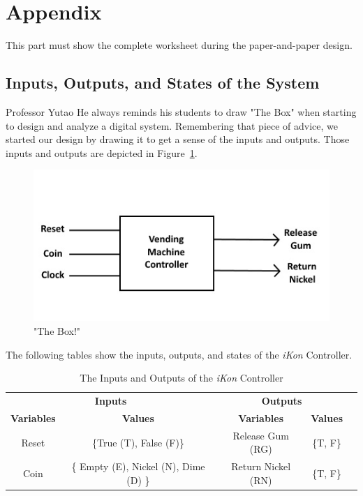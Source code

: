 \documentclass{article}
\begin{document}

\section{Appendix}
This part must show the complete worksheet during the paper-and-paper design.

\subsection{Inputs, Outputs, and States of the System}
Professor Yutao He always reminds his students to draw "The Box" when starting 
to design and analyze a digital system. Remembering that piece of advice, we 
started our design by drawing it to get a sense of the inputs and outputs. 
Those inputs and outputs are depicted in Figure~\ref{fig:box}. \\

\clearpage

\begin{figure}[h!]
\centering
\includegraphics[scale=0.7]{Box}
\caption{"The Box!"}
\label{fig:box}
\end{figure}

The following tables show the inputs, outputs, and states of the \textit{iKon} 
Controller.

\begin{table}[h]
\begin{center}
\begin{tabular}{|c|c|c|c|l}
\cline{1-4}
\multicolumn{2}{|c|}{ \textbf{Inputs} } & 
\multicolumn{2}{c|}{ \textbf{Outputs} } &  \\ \cline{1-4}
  \textbf{Variables} & \textbf{Values} & \textbf{Variables} & \textbf{Values} &
  \\ \cline{1-4}
  Reset & \{True (T), False (F)\} & Release Gum (RG) & \{T, F\} &  \\
  Coin & \{ Empty (E), Nickel (N), Dime (D) \} & Return Nickel (RN) & \{T, F\} 
  &  \\ \cline{1-4}
\end{tabular}
\caption{The Inputs and Outputs of the \textit{iKon} Controller}
\end{center}
\end{table}
\end{document}
